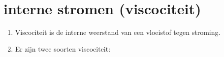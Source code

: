 \chapter{interne stromen (viscociteit)}
\label{ch:interne_stromen_viscociteit}

\begin{enumerate}\setlength\itemsep{0pt}
	\item Viscociteit is de interne weerstand van een vloeistof tegen stroming.
	\item Er zijn twee soorten viscociteit:
\end{enumerate}